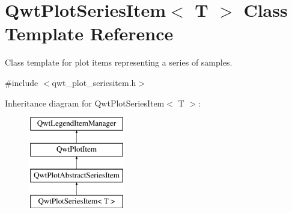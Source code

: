 \hypertarget{class_qwt_plot_series_item}{\section{Qwt\-Plot\-Series\-Item$<$ T $>$ Class Template Reference}
\label{class_qwt_plot_series_item}
}


Class template for plot items representing a series of samples.  




{\ttfamily \#include $<$qwt\-\_\-plot\-\_\-seriesitem.\-h$>$}

Inheritance diagram for Qwt\-Plot\-Series\-Item$<$ T $>$\-:\begin{figure}[H]
\begin{center}
\leavevmode
\includegraphics[height=4.000000cm]{class_qwt_plot_series_item}
\end{center}
\end{figure}
